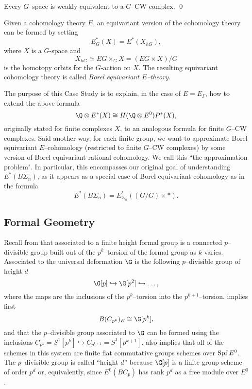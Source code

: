 \begin{theorem} \label{app:CWapprox}
Every \(G\)--space is weakly equivalent to a \(G\)--CW complex. \qed
\end{theorem}

Given a cohomology theory \(E\), an equivariant version of the cohomology theory can be formed by setting
\[
E^{*}_{G}(X) = E^*(X_{hG}),
\]
where \(X\) is a \(G\)-space and
\[
X_{hG} \simeq EG \times_G X = (EG \times X)/G
\]
is the homotopy orbits for the \(G\)-action on \(X\). The resulting equivariant cohomology theory is called \textit{Borel equivariant \(E\)--theory}.

The purpose of this Case Study is to explain, in the case of \(E = E_{\Gamma}\), how to extend the above formula \[\Q \otimes E^*(X) \cong H(\Q \otimes E^0)P^*(X),\] originally stated for finite complexes \(X\), to an analogous formula for finite \(G\)--CW complexes. Said another way, for each finite group, we want to approximate Borel equivariant \(E\)--cohomology (restricted to finite \(G\)--CW complexes) by some version of Borel equivariant rational cohomology. We call this ``the approximation problem".  In particular, this encompasses our original goal of understanding \(E^*(B\Sigma_n)\), as it appears as a special case of Borel equivariant cohomology as in the formula \[E^*(B\Sigma_n) = E_{\Sigma_n}^*((G/G) \times *).\]

\subsection*{Formal Geometry}


Recall from  that associated to a finite height formal group is a connected \(p\)--divisible group built out of the \(p^k\)--torsion of the formal group as \(k\) varies. Associated to the universal deformation \(\G\) is the following \(p\)--divisible group of height \(d\)
\[
\G[p] \hookrightarrow \G[p^2] \hookrightarrow \ldots,
\]
where the maps are the inclusions of the \(p^k\)--torsion into the \(p^{k+1}\)--torsion.   implies first 
\[
B(C_{p^k})_{E} \cong \G[p^k],
\]
and that the \(p\)--divisible group associated to \(\G\) can be formed using the inclusions \(C_{p^k} = S^1[p^k] \hookrightarrow C_{p^{k+1}} = S^1[p^{k+1}]\). 
 also implies that all of the schemes in this system are finite flat commutative groups schemes over \(\operatorname{Spf} E^0\). The \(p\)--divisible group is called ``height \(d\)'' because \(\G[p]\) is a finite group scheme of order \(p^d\) or, equivalently, since \(E^0(BC_p)\) has rank \(p^d\) as a free module over \(E^0\).

